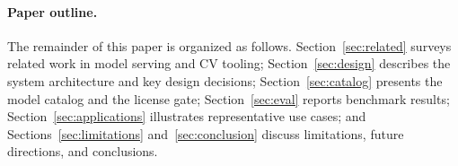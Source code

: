 \paragraph{Paper outline.}
The remainder of this paper is organized as follows. Section~\ref{sec:related} surveys
related work in model serving and CV tooling; Section~\ref{sec:design} describes the
system architecture and key design decisions; Section~\ref{sec:catalog} presents the model
catalog and the license gate; Section~\ref{sec:eval} reports benchmark results;
Section~\ref{sec:applications} illustrates representative use cases; and
Sections~\ref{sec:limitations} and~\ref{sec:conclusion} discuss limitations, future directions,
and conclusions.
